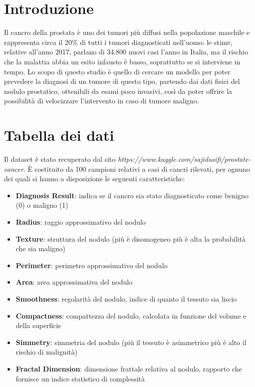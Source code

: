 \documentclass[11pt,a4paper,oneside]{article}
\begin{document}
\baselineskip 22pt


\tableofcontents\thispagestyle{empty}\clearpage

\section{Introduzione}
\baselineskip 12pt
Il cancro della prostata è uno dei tumori più diffusi nella popolazione maschile e rappresenta circa il 20\% di tutti i tumori diagnosticati nell'uomo: le stime, relative all'anno 2017, parlano di 34.800 nuovi casi l'anno in Italia, ma il rischio che la malattia abbia un esito infausto è basso, soprattutto se si interviene in tempo.
Lo scopo di questo studio è quello di cercare un modello per poter prevedere la diagnosi di un tumore di questo tipo, partendo dai dati fisici del nodulo prostatico, ottenibili da esami poco invasivi, così da poter offrire la possibilità di velocizzare l'intervento in caso di tumore maligno.

\section{Tabella dei dati}
Il dataset è stato recuperato dal sito \emph{https://www.kaggle.com/sajidsaifi/prostate-cancer}. È costituito da 100 campioni relativi a casi di cancri rilevati, per ognuno dei quali si hanno a disposizione le seguenti caratteristiche:
\begin{itemize}
\item \textbf{Diagnosis Result}: indica se il cancro sia stato diagnosticato come benigno (0) o maligno (1)
\item \textbf{Radius}: raggio approssimativo del nodulo
\item \textbf{Texture}: struttura del nodulo (più è disomogeneo più è alta la probabilità che sia maligno)
\item \textbf{Perimeter}: perimetro approssimativo del nodulo
\item \textbf{Area}: area approssimativa del nodulo
\item \textbf{Smoothness}: regolarità del nodulo, indice di quanto il tessuto sia liscio
\item \textbf{Compactness}: compattezza del nodulo, calcolata in funzione del volume e della superficie
\item \textbf{Simmetry}: simmetria del nodulo (più il tessuto è asimmetrico più è alto il rischio di malignità)
\item \textbf{Fractal Dimension}: dimensione frattale relativa al nodulo, rapporto che fornisce un indice statistico di complessità
\end{itemize}
\end{document}
